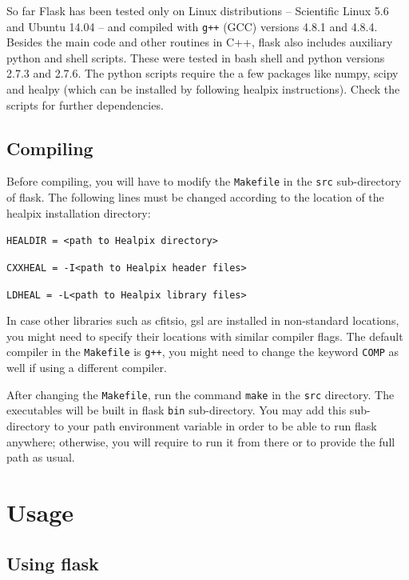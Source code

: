 \documentclass[12pt]{book} %
\begin{document}
So far {\sc Flask} has been tested only on Linux distributions -- Scientific Linux 5.6 and Ubuntu 14.04 -- 
and compiled with {\tt g++} (GCC) versions 4.8.1 and 4.8.4.   
Besides the main code and other routines in {\sc C++}, {\sc flask} also includes auxiliary {\sc python} 
and {\sc shell} scripts. These were tested in {\sc bash} shell and {\sc python} versions 2.7.3 and 2.7.6. 
The {\sc python} scripts require the a few packages like {\sc numpy}, {\sc scipy} and {\sc healpy} 
(which can be installed by following {\sc healpix} instructions). Check the scripts for further dependencies.  

\section{Compiling}
\label{sec:compiling}

Before compiling, you will have to modify the {\tt Makefile} in the {\tt src} sub-directory of {\sc flask}. 
The following lines must be changed according to the location of the {\sc healpix} installation directory:

\vspace{0.5cm}

\noindent
{\tt HEALDIR = <path to Healpix directory>}

\noindent
{\tt CXXHEAL = -I<path to Healpix header files>}

\noindent
{\tt LDHEAL  = -L<path to Healpix library files>} 
\vspace{0.5cm}

\noindent
In case other libraries such as {\sc cfitsio}, {\sc gsl} are installed in non-standard locations, 
you might need to specify their locations with similar compiler flags. The default compiler in the 
{\tt Makefile} is {\tt g++}, you might need to change the keyword {\tt COMP} as well if using a 
different compiler.

After changing the {\tt Makefile}, run the command {\tt make} in the {\tt src} directory. The 
executables will be built in {\sc flask} {\tt bin} sub-directory. You may add this sub-directory to 
your {\sc path} environment variable in order to be able to run {\sc flask} anywhere; otherwise, 
you will require to run it from there or to provide the full path as usual. 


\chapter{Usage}
\label{sec:usage}

\section{Using {\sc flask}}
\label{sec:flask}
\end{document}
